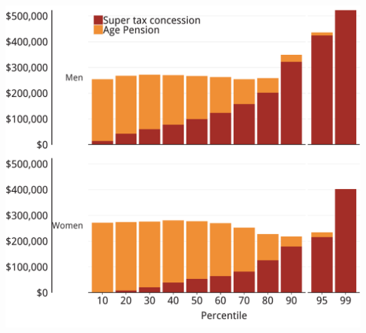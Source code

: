 \documentclass[tikz]{standalone}\usepackage[]{graphicx}\usepackage[]{color}
\newenvironment{knitrout}{}{} %
\begin{document}
\begin{knitrout}
\color{fgcolor}
\includegraphics[width=11.000in,height=10in]{./Super-tax-targeting/b5-super-atlas/Figure3-9-1} 

\end{knitrout}
\end{document}
